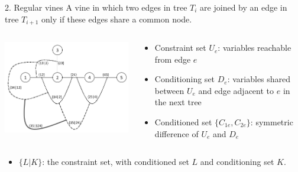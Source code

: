 \documentclass[
  ignorenonframetext,
]{beamer}
\providecommand{\tightlist}{%
  \setlength{\itemsep}{0pt}\setlength{\parskip}{0pt}}
\begin{document}
\begin{frame}{2. Regular vines}
\protect\hypertarget{regular-vines}{}
\small A vine in which two edges in tree \(T_i\) are joined by an edge
in tree \(T_{i+1}\) only if these edges share a common node.

\begin{columns}[T]
  \begin{column}{.5\textwidth}
    \centering
    \includegraphics[width=1.1\textwidth]{regular_vine.png}
  \end{column}
  \begin{column}{.5\textwidth}
    \begin{itemize}
      \item Constraint set $U_e$: variables reachable from edge $e$
      \item Conditioning set $D_e$: variables shared between $U_e$ and edge adjacent to $e$ in the next tree
      \item Conditioned set $\{C_{1e}, C_{2e}\}$: symmetric difference of $U_e$ and $D_e$
    \end{itemize}
  \end{column}
\end{columns}

\begin{itemize}
\tightlist
\item
  \(\{L|K\}\): the constraint set, with conditioned set \(L\) and
  conditioning set \(K\).
\end{itemize}
\end{frame}
\end{document}
